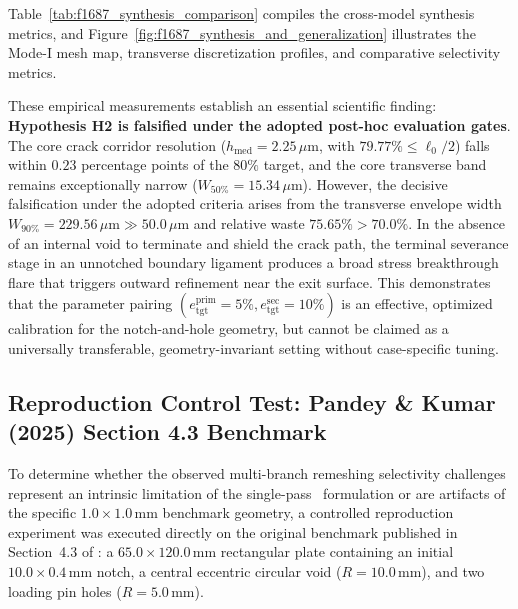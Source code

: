 Table~\ref{tab:f1687_synthesis_comparison} compiles the cross-model synthesis metrics, and Figure~\ref{fig:f1687_synthesis_and_generalization} illustrates the Mode-I mesh map, transverse discretization profiles, and comparative selectivity metrics. 

These empirical measurements establish an essential scientific finding: \textbf{Hypothesis H2 is falsified under the adopted post-hoc evaluation gates}. The core crack corridor resolution ($h_{\mathrm{med}} = 2.25\,\mu\mathrm{m}$, with $79.77\% \le \ell_0/2$) falls within $0.23$ percentage points of the $80\%$ target, and the core transverse band remains exceptionally narrow ($W_{50\%} = 15.34\,\mu\mathrm{m}$). However, the decisive falsification under the adopted criteria arises from the transverse envelope width $W_{90\%} = 229.56\,\mu\mathrm{m} \gg 50.0\,\mu\mathrm{m}$ and relative waste $75.65\% > 70.0\%$. In the absence of an internal void to terminate and shield the crack path, the terminal severance stage in an unnotched boundary ligament produces a broad stress breakthrough flare that triggers outward refinement near the exit surface. This demonstrates that the parameter pairing $(e_{\mathrm{tgt}}^{\mathrm{prim}} = 5\%, e_{\mathrm{tgt}}^{\mathrm{sec}} = 10\%)$ is an effective, optimized calibration for the notch-and-hole geometry, but cannot be claimed as a universally transferable, geometry-invariant setting without case-specific tuning.

\subsection{Reproduction Control Test: Pandey \& Kumar (2025) Section 4.3 Benchmark}
\label{subsec:pandey_kumar_sec43_control}

To determine whether the observed multi-branch remeshing selectivity challenges represent an intrinsic limitation of the single-pass \MISESERI\ formulation or are artifacts of the specific $1.0 \times 1.0\,\mathrm{mm}$ benchmark geometry, a controlled reproduction experiment was executed directly on the original benchmark published in Section~4.3 of \citet{pandey2025}: a $65.0 \times 120.0\,\mathrm{mm}$ rectangular plate containing an initial $10.0 \times 0.4\,\mathrm{mm}$ notch, a central eccentric circular void ($R = 10.0\,\mathrm{mm}$), and two loading pin holes ($R = 5.0\,\mathrm{mm}$).

